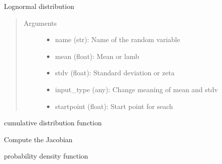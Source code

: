 \documentclass[letterpaper,10pt,english]{sphinxmanual}
\begin{document}
\begin{fulllineitems}
Lognormal distribution
\begin{quote}\begin{description}
\item[{Arguments }] \leavevmode\begin{itemize}
\item {} 
name (str):         Name of the random variable

\item {} 
mean (float):       Mean or lamb

\item {} 
stdv (float):       Standard deviation or zeta

\item {} 
input\_type (any):   Change meaning of mean and stdv

\item {} 
startpoint (float): Start point for seach

\end{itemize}

\end{description}\end{quote}


\begin{fulllineitems}
cumulative distribution function

\end{fulllineitems}



\begin{fulllineitems}
Compute the Jacobian

\end{fulllineitems}



\begin{fulllineitems}
probability density function

\end{fulllineitems}




\end{fulllineitems}
\end{document}
